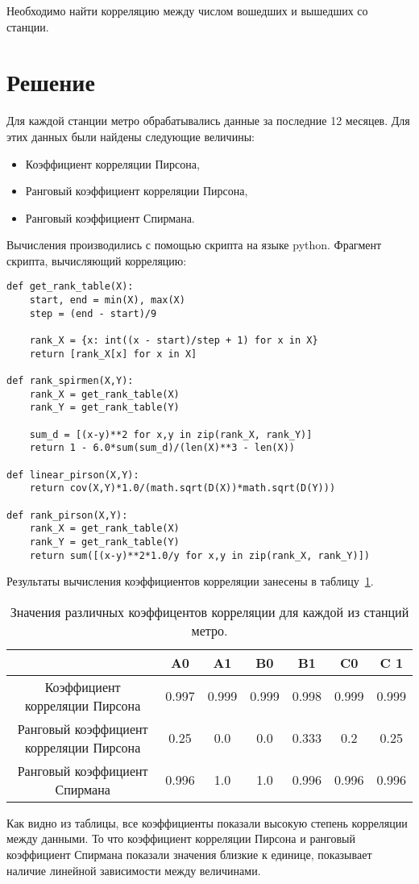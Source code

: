 \documentclass[12pt,a4paper,oneside]{extarticle}
\begin{document}
    Необходимо найти корреляцию между числом вошедших и вышедших со станции.

\section{Решение}
    Для каждой станции метро обрабатывались данные за последние 12 месяцев. Для этих данных были найдены следующие величины:
    \begin{itemize}
        \item Коэффициент корреляции Пирсона,
        \item Ранговый коэффициент корреляции Пирсона,
        \item Ранговый коэффициент Спирмана.
    \end{itemize}

    Вычисления производились с помощью скрипта на языке python. Фрагмент скрипта, вычисляющий корреляцию:
    \begin{lstlisting}
def get_rank_table(X):
    start, end = min(X), max(X)
    step = (end - start)/9

    rank_X = {x: int((x - start)/step + 1) for x in X}
    return [rank_X[x] for x in X]

def rank_spirmen(X,Y):
    rank_X = get_rank_table(X)
    rank_Y = get_rank_table(Y)

    sum_d = [(x-y)**2 for x,y in zip(rank_X, rank_Y)]
    return 1 - 6.0*sum(sum_d)/(len(X)**3 - len(X))

def linear_pirson(X,Y):
    return cov(X,Y)*1.0/(math.sqrt(D(X))*math.sqrt(D(Y)))

def rank_pirson(X,Y):
    rank_X = get_rank_table(X)
    rank_Y = get_rank_table(Y)
    return sum([(x-y)**2*1.0/y for x,y in zip(rank_X, rank_Y)])
    \end{lstlisting}
    
    Результаты вычисления коэффициентов корреляции занесены в таблицу~\ref{tabular:syntax}.
    \begin{table}[ht!]
        \caption{Значения различных коэффицентов корреляции для каждой из станций метро.}
        \centering
        \label{tabular:syntax}
        \begin{tabular}{|c|c|c|c|c|c|c|}
            \hline
                                                    & A0    & A1    & B0    & B1    & C0    & C 1 \\ \hline
            Коэффициент корреляции Пирсона          & 0.997 & 0.999 & 0.999 & 0.998 & 0.999 & 0.999 \\ \hline
            Ранговый коэффициент корреляции Пирсона & 0.25  & 0.0   & 0.0   & 0.333 & 0.2   & 0.25 \\ \hline
            Ранговый коэффициент Спирмана           & 0.996 & 1.0   & 1.0   & 0.996 & 0.996 & 0.996 \\ \hline
        \end{tabular}
    \end{table}

    Как видно из таблицы, все коэффициенты показали высокую степень корреляции между данными. То что коэффициент корреляции Пирсона и ранговый коэффициент Спирмана показали значения близкие к единице, показывает наличие линейной зависимости между величинами.
\end{document}
